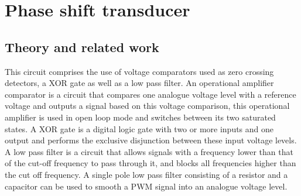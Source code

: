\chapter{Phase shift transducer}
\section{Theory and related work} \label{sec:literature_linear}
This circuit comprises the use of voltage comparators used as zero crossing detectors, a XOR gate as well as a low pass filter. An operational amplifier comparator is a circuit that compares one analogue voltage level with a reference voltage and outputs a signal based on this voltage comparison, this operational amplifier is used in open loop mode and switches between its two saturated states. %
A XOR gate is a digital logic gate with two or more inputs and one output and performs the exclusive disjunction between these input voltage levels. %
A low pass filter is a circuit that allows signals with a frequency lower than that of the cut-off frequency to pass through it, and blocks all frequencies higher than the cut off frequency. A single pole low pass filter consisting of a resistor and a capacitor can be used to smooth a PWM signal into an analogue voltage level.
